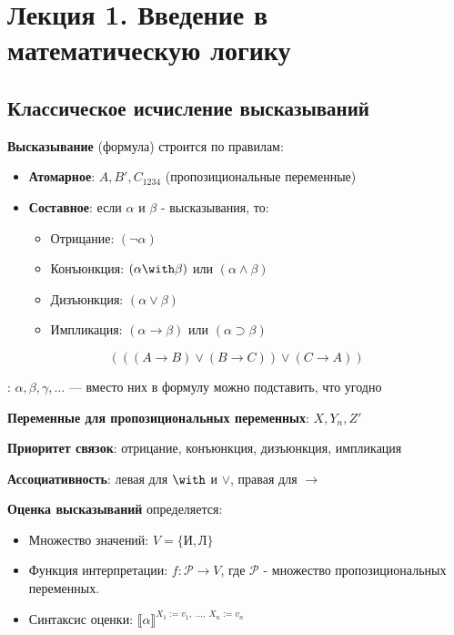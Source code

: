 \section{Лекция 1. Введение в математическую логику}



\subsection{Классическое исчисление высказываний}




\textbf{Высказывание} (формула) строится по правилам:
\begin{itemize}
\item \textbf{Атомарное}: $A, B', C_{1234}$ (пропозициональные переменные)
\item \textbf{Составное}: если $\alpha$ и $\beta$ - высказывания, то:
\begin{itemize}
\item Отрицание: $(\neg\alpha)$
\item Конъюнкция: $(\alpha\with\beta)$ или $(\alpha\wedge\beta)$
\item Дизъюнкция: $(\alpha\vee\beta)$
\item Импликация: $(\alpha\rightarrow\beta)$ или $(\alpha\supset\beta)$
\end{itemize}
\end{itemize}


\begin{exmprus}
$$(((A\rightarrow B)\vee (B\rightarrow C)) \vee (C \rightarrow A))$$
\end{exmprus}


: $\alpha, \beta, \gamma, \dots$ --- вместо них в формулу можно подставить, что угодно
 
 \textbf{Переменные для пропозициональных переменных}: $X, Y_n, Z'$
 
 \textbf{Приоритет связок}: отрицание, конъюнкция, дизъюнкция, импликация 
 
 \textbf{Ассоциативность}: левая для $\with$ и $\vee$, правая для $\rightarrow$







 \textbf{Оценка высказываний} определяется:
\begin{itemize}
\item Множество значений: $V = \{\textit{И},\textit{Л}\}$
\item Функция интерпретации: $f: \mathcal{P} \rightarrow V$,  где $\mathcal{P}$ - множество пропозициональных переменных.
\item Синтаксис оценки: $\llbracket \alpha \rrbracket^{X_1 := v_1,\ \dots,\ X_n := v_n}$
\end{itemize}



